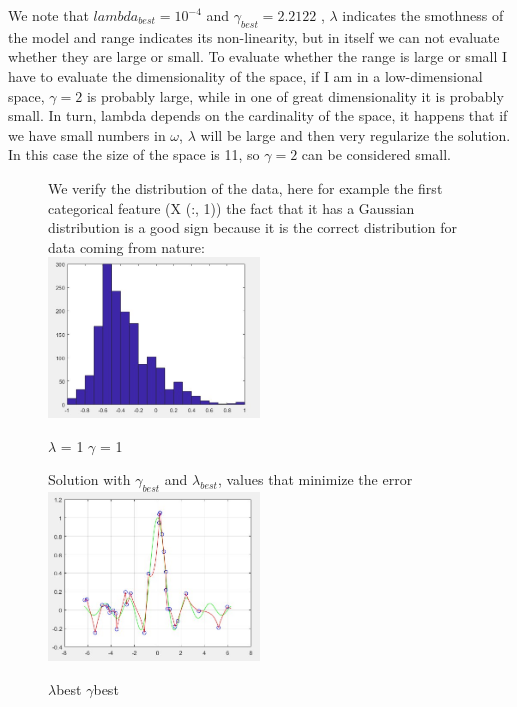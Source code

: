 We note that $lambda_{best} = 10^{-4}$ and $\gamma_{best} = 2.2122$
, $\lambda$ indicates the smothness of the model and range indicates its non-linearity, but in itself we can not evaluate whether they are large or small.
To evaluate whether the range is large or small I have to evaluate the dimensionality of the space, if I am in a low-dimensional space, $\gamma = 2$ is probably large, while in one of great dimensionality it is probably small. In turn, lambda depends on the cardinality of the space, it happens that if we have small numbers in $\omega$, $\lambda$ will be large and then very regularize the solution.
In this case the size of the space is 11, so $\gamma = 2$ can be considered small.\\
\begin{figure}
We verify the distribution of the data, here for example the first categorical feature (X (:, 1)) the fact that it has a Gaussian distribution is a good sign because it is the correct distribution for data coming from nature:\\
	
	\includegraphics[width=0.5\textwidth]{hist1.png}
	\centering
	\caption{$\lambda$ = 1 $\gamma$ = 1}
	\label{fig:\lambda = 1 \gamma = 1}

	
\end{figure}

\begin{figure}

Solution with $\gamma_{best}$ and $\lambda_{best}$, values that minimize the error\\

	\includegraphics[width=0.5\textwidth]{kmlbgb.png}
	\centering
	\caption{$\lambda$best $\gamma$best}
	
	
\end{figure}

